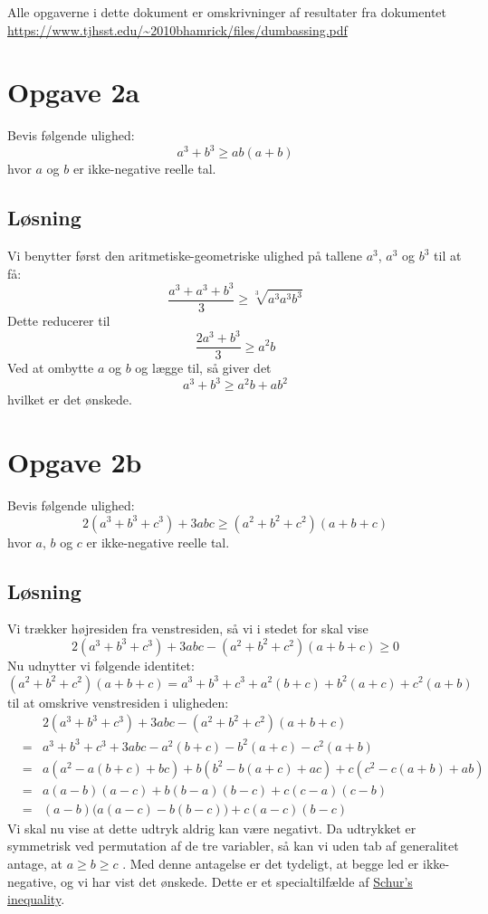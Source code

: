 \documentclass[12pt,oneside,a4paper]{article}
\newcommand{\bas}{\begin{eqnarray*}}
\newcommand{\eas}{\end{eqnarray*}}
\begin{document}
Alle opgaverne i dette dokument er omskrivninger af resultater fra dokumentet 
\url{https://www.tjhsst.edu/~2010bhamrick/files/dumbassing.pdf}


\section{Opgave 2a}
Bevis følgende ulighed:
$$
a^3+b^3 \ge ab(a+b)
$$
hvor $a$ og $b$ er ikke-negative reelle tal.

\subsection{Løsning}

Vi benytter først den aritmetiske-geometriske ulighed på tallene $a^3$, $a^3$ og $b^3$ til at få:
$$
\frac{a^3+a^3+b^3}{3} \ge \sqrt[3]{a^3 a^3 b^3}
$$
Dette reducerer til
$$
\frac{2a^3+b^3}{3} \ge a^2b
$$
Ved at ombytte $a$ og $b$ og lægge til, så giver det
$$
a^3+b^3 \ge a^2b + ab^2
$$
hvilket er det ønskede.

\section{Opgave 2b}
Bevis følgende ulighed:
$$
2(a^3+b^3+c^3) + 3abc \ge (a^2+b^2+c^2)(a+b+c)
$$
hvor $a$, $b$ og $c$ er ikke-negative reelle tal.

\subsection{Løsning}

Vi trækker højresiden fra venstresiden, så vi i stedet for skal vise
$$
2(a^3+b^3+c^3) + 3abc - (a^2+b^2+c^2)(a+b+c) \ge 0
$$
Nu udnytter vi følgende identitet:
$$
(a^2+b^2+c^2)(a+b+c) = a^3+b^3+c^3 + a^2(b+c) + b^2(a+c) + c^2(a+b)
$$
til at omskrive venstresiden i uligheden:
\bas
&& 2(a^3+b^3+c^3) + 3abc - (a^2+b^2+c^2)(a+b+c) \\
&=& a^3+b^3+c^3 + 3abc - a^2(b+c) - b^2(a+c) - c^2(a+b) \\
&=& a\left(a^2-a(b+c)+bc\right) + b\left(b^2-b(a+c)+ac\right) + c\left(c^2-c(a+b)+ab\right) \\
&=& a(a-b)(a-c) + b(b-a)(b-c) + c(c-a)(c-b) \\
&=& (a-b)\Big(a(a-c)-b(b-c)\Big) + c(a-c)(b-c)
\eas
Vi skal nu vise at dette udtryk aldrig kan være negativt.  Da udtrykket er
symmetrisk ved permutation af de tre variabler, så kan vi uden tab af
generalitet antage, at $a \ge b \ge c$ .  Med denne antagelse er det tydeligt,
at begge led er ikke-negative, og vi har vist det ønskede.
Dette er et specialtilfælde af \href{https://en.wikipedia.org/wiki/Schur\%27s\_inequality}{Schur's inequality}.
\end{document}

